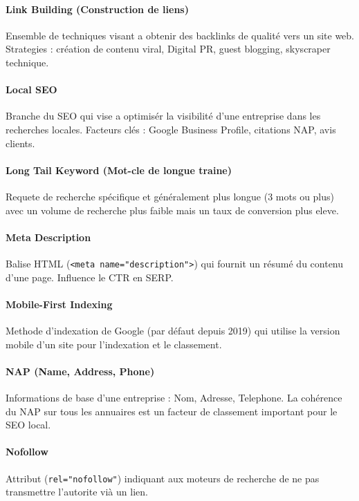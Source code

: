 \documentclass[12pt,a4paper,twoside]{report}
\begin{document}
\paragraph*{Link Building (Construction de liens)}
Ensemble de techniques visant a obtenir des backlinks de qualité vers un site web. Strategies : création de contenu viral, Digital PR, guest blogging, skyscraper technique.

\paragraph*{Local SEO}
Branche du SEO qui vise a optimisér la visibilité d'une entreprise dans les recherches locales. Facteurs clés : Google Business Profile, citations NAP, avis clients.

\paragraph*{Long Tail Keyword (Mot-cle de longue traine)}
Requete de recherche spécifique et généralement plus longue (3 mots ou plus) avec un volume de recherche plus faible mais un taux de conversion plus eleve.

\paragraph*{Meta Description}
Balise HTML (\texttt{<meta name="description">}) qui fournit un résumé du contenu d'une page. Influence le CTR en SERP.

\paragraph*{Mobile-First Indexing}
Methode d'indexation de Google (par défaut depuis 2019) qui utilise la version mobile d'un site pour l'indexation et le classement.

\paragraph*{NAP (Name, Address, Phone)}
Informations de base d'une entreprise : Nom, Adresse, Telephone. La cohérence du NAP sur tous les annuaires est un facteur de classement important pour le SEO local.

\paragraph*{Nofollow}
Attribut (\texttt{rel="nofollow"}) indiquant aux moteurs de recherche de ne pas transmettre l'autorite vià un lien.
\end{document}
